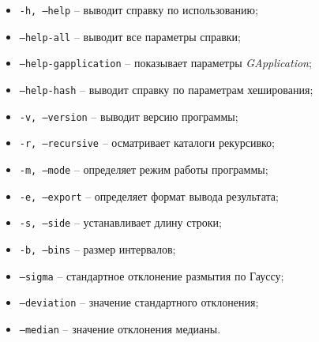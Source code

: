 \begin{itemize}
    \item \texttt{-h, --help} -- выводит справку по использованию;
    \item \texttt{--help-all} -- выводит все параметры справки;
    \item \texttt{--help-gapplication} -- показывает параметры
          \textit{GApplication};
    \item \texttt{--help-hash} -- выводит справку по параметрам хеширования;
    \item \texttt{-v, --version} -- выводит версию программы;
    \item \texttt{-r, --recursive} -- осматривает каталоги рекурсивко;
    \item \texttt{-m, --mode} -- определяет режим работы программы;
    \item \texttt{-e, --export} -- определяет формат вывода результата;
    \item \texttt{-s, --side} -- устанавливает длину строки;
    \item \texttt{-b, --bins} -- размер интервалов;
    \item \texttt{--sigma} -- стандартное отклонение размытия по Гауссу;
    \item \texttt{--deviation} -- значение стандартного отклонения;
    \item \texttt{--median} -- значение отклонения медианы.
\end{itemize}
